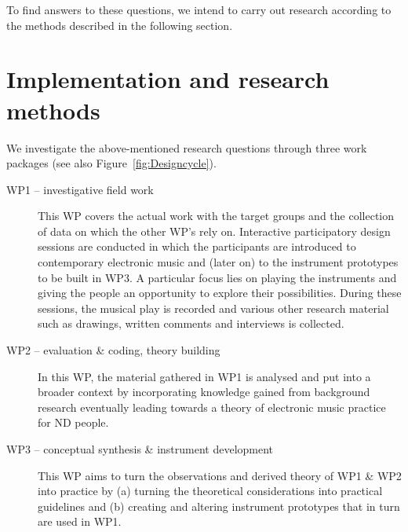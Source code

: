 \documentclass{chi-ext}
\begin{document}
\begin{multicols}{2}
To find answers to these questions, we intend to carry out research according to the methods described in the following section.

\section{Implementation and research methods}
\label{sec:timeline}


We investigate the above-mentioned research questions through three work packages (see also  Figure~\ref{fig:Designcycle}).
\begin{description}
	\item[WP1 -- investigative field work] 
	 This WP covers the actual work with the target groups and the collection of data on which the other WP’s rely on. 
	Interactive participatory design sessions are conducted in which the participants are introduced to contemporary electronic music and (later on) to the instrument prototypes to be built in WP3. 
	A particular focus lies on playing the instruments and giving the people an opportunity to explore their possibilities. 
	During these sessions, the musical play is recorded and various other research material such as drawings, written comments and interviews is collected.
	\item[WP2 -- evaluation \& coding, theory building] 
	In this WP, the material gathered in WP1 is analysed and put into a broader context by incorporating knowledge gained from background research eventually leading towards a theory of electronic music practice for ND people.
	\item[WP3 -- conceptual synthesis \& instrument development]  
	This WP aims to turn the observations and derived theory of WP1 \& WP2 into practice by (a) turning the theoretical considerations into practical guidelines and (b) creating and altering instrument prototypes that in turn are used in WP1.
\end{description}


\end{multicols}
\end{document}
